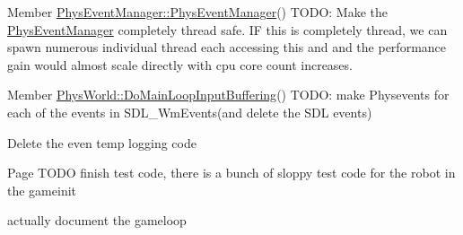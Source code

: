 \label{todo__todo000002}
\hypertarget{todo__todo000002}{}
 
\begin{DoxyDescription}
\item[Member \hyperlink{classPhysEventManager_a217e7f6006aaf5e08e2872fa4d66e5e2}{PhysEventManager::PhysEventManager}() ]TODO: Make the \hyperlink{classPhysEventManager}{PhysEventManager} completely thread safe. IF this is completely thread, we can spawn numerous individual thread each accessing this and and the performance gain would almost scale directly with cpu core count increases. 
\end{DoxyDescription}

\label{todo__todo000010}
\hypertarget{todo__todo000010}{}
 
\begin{DoxyDescription}
\item[Member \hyperlink{classPhysWorld_a81b3f0dcc0a90d039623f696343e6e9c}{PhysWorld::DoMainLoopInputBuffering}() ]TODO: make Physevents for each of the events in SDL\_\-WmEvents(and delete the SDL events) 

Delete the even temp logging code 
\end{DoxyDescription}

\label{todo__todo000008}
\hypertarget{todo__todo000008}{}
 
\begin{DoxyDescription}
\item[Page \hyperlink{MainLoop}{} ]TODO finish test code, there is a bunch of sloppy test code for the robot in the gameinit 

actually document the gameloop 
\end{DoxyDescription}